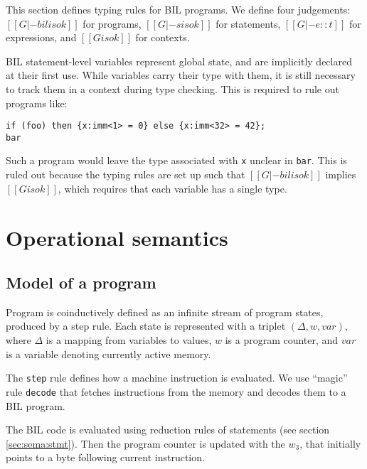 \documentclass[11pt]{article}
\begin{document}
This section defines typing rules for BIL programs.  We define four
judgements: $[[G |- bil is ok]]$ for programs, $[[G |- s is ok]]$ for
statements, $[[G |- e :: t]]$ for expressions, and $[[G is ok]]$ for
contexts.

BIL statement-level variables represent global state, and are
implicitly declared at their first use.  While variables carry their
type with them, it is still necessary to track them in a context
during type checking.  This is required to rule out programs like:
\begin{verbatim}
if (foo) then {x:imm<1> = 0} else {x:imm<32> = 42};
bar
\end{verbatim}
Such a program would leave the type associated with {\tt x} unclear in
{\tt bar}.  This is ruled out because the typing rules are set up such
that $[[G |- bil is ok]]$ implies $[[G is ok]]$, which requires that
each variable has a single type.

\ottdefnstypingXXstmt

\ottdefnstypingXXexp

\ottdefnstypingXXtype

\ottdefnstypingXXgamma

\clearpage


\section{Operational semantics}

\subsection{Model of a program}

Program is coinductively defined as an infinite stream of program
states, produced by a step rule. Each state is represented with a
triplet $(\Delta, w, var)$, where $\Delta$ is a mapping from variables
to values, $w$ is a program counter, and $var$ is a variable
denoting currently active memory.

The \verb|step| rule defines how a machine instruction is
evaluated. We use ``magic'' rule \verb|decode| that fetches
instructions from the memory and decodes them to a BIL program.

The BIL code is evaluated using reduction rules of statements (see
section \ref{sec:sema:stmt}). Then the program counter is updated with
the $w_3$, that initially points to a byte following current instruction.

\ottdefnsprogram
\end{document}
